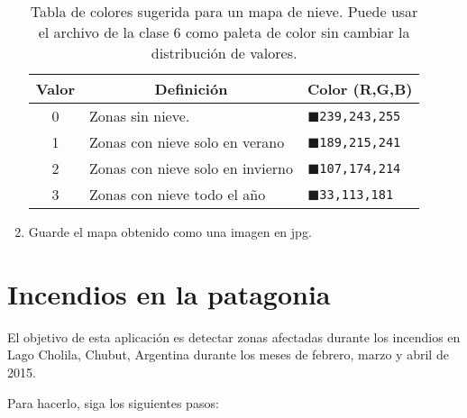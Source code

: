 \begin{enumerate}
\begin{table}[]
\centering
\begin{tabular}{@{}cll@{}}
\toprule
Valor  & \multicolumn{1}{c}{Definición}   & \multicolumn{1}{c}{Color (R,G,B)}                       \\ \midrule
0      & Zonas sin nieve.                 & \textcolor{N1}{$\blacksquare$}\texttt{239,243,255} \\
1      & Zonas con nieve solo en verano   & \textcolor{N2}{$\blacksquare$}\texttt{189,215,241} \\
2      & Zonas con nieve solo en invierno & \textcolor{N3}{$\blacksquare$}\texttt{107,174,214} \\
3      & Zonas con nieve todo el año      & \textcolor{N4}{$\blacksquare$}\texttt{33,113,181} \\ \bottomrule
\end{tabular}
\caption{Tabla de colores sugerida para un mapa de nieve. Puede usar el archivo  de la clase 6 como paleta de color sin cambiar la distribución de valores.}
\label{tab:nieve}
\end{table}

\item Guarde el mapa obtenido como una imagen en jpg.
\end{enumerate}

\section{Incendios en la patagonia}

El objetivo de esta aplicación es detectar zonas afectadas durante los incendios en Lago Cholila, Chubut, Argentina durante los meses de febrero, marzo y abril de 2015.

Para hacerlo, siga los siguientes pasos:

